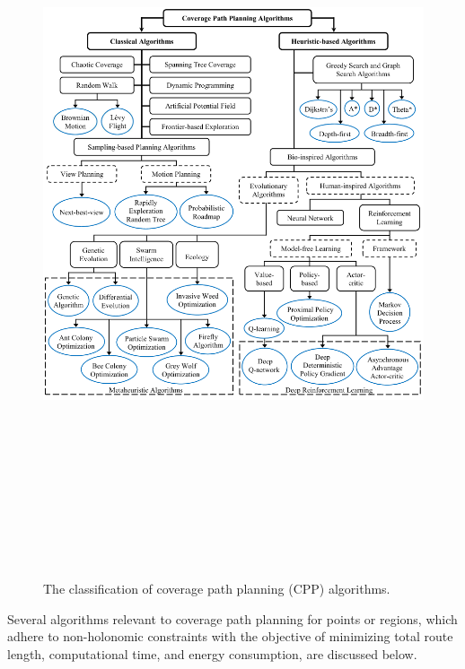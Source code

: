 \begin{figure}[htbp]
    \centering
    \includegraphics[height=22cm, width=\textwidth]{Images/general/general_classification.png}
    \caption{The classification of coverage path planning (CPP) algorithms.}
    \label{fig:classifications_of_CPP}
\end{figure}

\vspace{6mm}

Several algorithms relevant to coverage path planning for points or regions, which adhere to non-holonomic constraints with the objective of minimizing total route length, computational time, and energy consumption, are discussed below.


